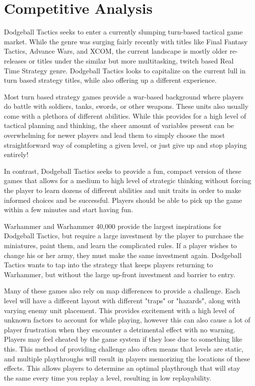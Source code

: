 \documentclass [12pt]{article}
\begin{document}
\section*{Competitive Analysis}

Dodgeball Tactics seeks to enter a currently slumping turn-based tactical game market. While the genre was surging fairly recently with titles like Final Fantasy Tactics, Advance Wars, and XCOM, the current landscape is mostly older re-releases or titles under the similar but more multitasking, twitch based Real Time Strategy genre. Dodgeball Tactics looks to capitalize on the current lull in turn based strategy titles, while also offering up a different experience.

Most turn based strategy games provide a war-based background where players do battle with soldiers, tanks, swords, or other weapons. These units also usually come with a plethora of different abilities. While this provides for a high level of tactical planning and thinking, the sheer amount of variables present can be overwhelming for newer players and lead them to simply choose the most straightforward way of completing a given level, or just give up and stop playing entirely!

In contrast, Dodgeball Tactics seeks to provide a fun, compact version of these games that allows for a medium to high level of strategic thinking without forcing the player to learn dozens of different abilities and unit traits in order to make informed choices and be successful. Players should be able to pick up the game within a few minutes and start having fun.

Warhammer and Warhammer 40,000 provide the largest inspirations for Dodgeball Tactics, but require a large investment by the player to purchase the miniatures, paint them, and learn the complicated rules. If a player wishes to change his or her army, they must make the same investment again. Dodgeball Tactics wants to tap into the strategy that keeps players returning to Warhammer, but without the large up-front investment and barrier to entry.

Many of these games also rely on map differences to provide a challenge. Each level will have a different layout with different "traps" or "hazards", along with varying enemy unit placement. This provides excitement with a high level of unknown factors to account for while playing, however this can also cause a lot of player frustration when they encounter a detrimental effect with no warning. Players may feel cheated by the game system if they lose due to something like this. This method of providing challenge also often means that levels are static, and multiple playthroughs will result in players memorizing the locations of these effects. This allows players to determine an optimal playthrough that will stay the same every time you replay a level, resulting in low replayability.
\end{document}
